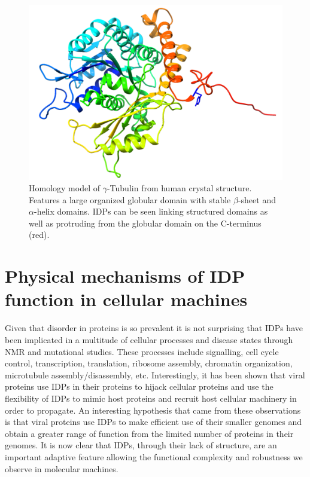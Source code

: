 \begin{figure}
\centering
\includegraphics[height=0.35\textheight]{figures/tub4_tyr.png}
\caption{Homology model of $\gamma$-Tubulin from human crystal structure. Features a large organized globular domain with stable  $\beta$-sheet and $\alpha$-helix domains. IDPs can be seen linking structured domains as well as protruding from the globular domain on the C-terminus (red). }
\label{tub4}
\end{figure}

\section{Physical mechanisms of IDP function in cellular machines}

Given that disorder in proteins is so prevalent it is not surprising that IDPs have been implicated in a multitude of cellular processes and disease states through NMR and mutational studies. These processes include signalling, cell cycle control, transcription, translation, ribosome assembly, chromatin organization, microtubule assembly/disassembly, etc. Interestingly, it has been shown that viral proteins use IDPs in their proteins to hijack cellular proteins and use the flexibility of IDPs to mimic host proteins and recruit host cellular machinery in order to propagate.\cite{davey2011viruses} An interesting hypothesis that came from these observations is that viral proteins use IDPs to make efficient use of their smaller genomes and obtain a greater range of function from the limited number of proteins in their genomes. It is now clear that IDPs, through their lack of structure, are an important adaptive feature allowing the functional complexity and robustness we observe in molecular machines. \\


